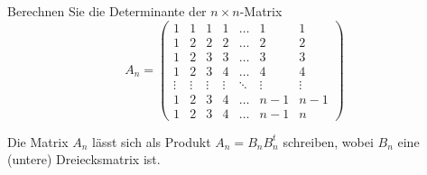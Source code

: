 Berechnen Sie die Determinante der $n\times n$-Matrix
\[
A_n
=
\begin{pmatrix}
     1&     1&     1&     1& \dots&     1&     1\\
     1&     2&     2&     2& \dots&     2&     2\\
     1&     2&     3&     3& \dots&     3&     3\\
     1&     2&     3&     4& \dots&     4&     4\\
\vdots&\vdots&\vdots&\vdots&\ddots&\vdots&\vdots\\
     1&     2&     3&     4& \dots&   n-1&   n-1\\
     1&     2&     3&     4& \dots&   n-1&     n
\end{pmatrix}
\]
\begin{hinweis}
Die Matrix $A_n$ lässt sich als Produkt $A_n=B_nB_n^t$ schreiben, wobei 
$B_n$ eine (untere) Dreiecksmatrix ist.
\end{hinweis}


